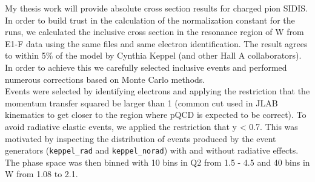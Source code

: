 
My thesis work will provide absolute cross section results for charged pion SIDIS.  In order to build trust in the calculation of the normalization constant for the runs, we calculated the inclusive cross section in the resonance region of W from E1-F data using the same files and same electron identification.  The result agrees to within 5\% of the model by Cynthia Keppel (and other Hall A collaborators).  In order to achieve this we carefully selected inclusive events and performed numerous corrections based on Monte Carlo methods.  \\

Events were selected by identifying electrons and applying the restriction that the momentum transfer squared be larger than 1 (common cut used in JLAB kinematics to get closer to the region where pQCD is expected to be correct).  To avoid radiative elastic events, we applied the restriction that y < 0.7.  This was motivated by inspecting the distribution of events produced by the event generators (\texttt{keppel\_rad} and \texttt{keppel\_norad}) with and without radiative effects.  The phase space was then binned with 10 bins in Q2 from 1.5 - 4.5 and 40 bins in W from 1.08 to 2.1.  \\

